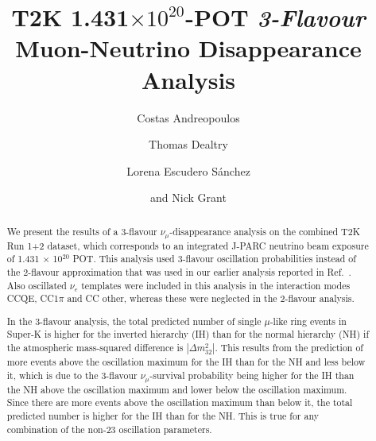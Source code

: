 %
%

\begin{frontmatter}

\title{
  T2K 1.431$\times10^{20}$-POT {\em 3-Flavour} Muon-Neutrino Disappearance Analysis
}

\vspace*{0.7cm}

\author[RAL]      {Costas Andreopoulos}
\author[RAL,OXF]  {Thomas Dealtry}
\author[VALENCIA] {Lorena Escudero S\'anchez}
\author[LANCS]    {and Nick Grant}

\address[RAL]{Particle Physics Dept., Rutherford Appleton Laboratory, STFC \\
              Harwell Science and Innovation Campus\\
              Oxfordshire OX11 0QX, UK}
\address[OXF]{Subdepartment of Particle Physics, University of Oxford \\
              Denys Wilkinson Building, Keble Road\\
              Oxfordshire OX1 3RH, UK}
\address[LANCS]{Physics Dept., Lancaster University \\
              Lancaster, LA1 4YB, UK}
\address[VALENCIA]{Instituto de Física Corpuscular, Edificio Institutos de Investigación \\
              Apartado de Correos 22085, E-46071 Valencia, Spain}

%
%

\begin{abstract}

We present the results of a 3-flavour $\nu_{\mu}$-disappearance analysis on the combined T2K Run 1+2 
dataset, which corresponds to an integrated J-PARC neutrino beam exposure of 1.431 $\times$ 10$^{20}$ POT. 
This analysis used 3-flavour oscillation probabilities instead of the 2-flavour approximation that was used 
in our earlier analysis reported in Ref.\ \cite{OurRun1and2Analysis2F}. Also oscillated $\nu_{e}$ templates 
were included in this analysis in the interaction modes CCQE, CC1$\pi$ and CC other, whereas these were 
neglected in the 2-flavour analysis. 

In the 3-flavour analysis, the total predicted number of single $\mu$-like ring events in Super-K is higher
for the inverted hierarchy (IH) than for the normal hierarchy (NH) if the atmospheric mass-squared difference
is $|\Delta m^{2}_{32}|$. This results from the prediction of more events above the oscillation maximum for 
the IH than for the NH and less below it, which is due to the 3-flavour $\nu_{\mu}$-survival probability being 
higher for the IH than the NH above the oscillation maximum and lower below the oscillation maximum. Since there 
are more events above the oscillation maximum than below it, the total predicted number is higher for the IH 
than for the NH. This is true for any combination of the non-23 oscillation parameters.


\end{abstract}
\end{frontmatter}
